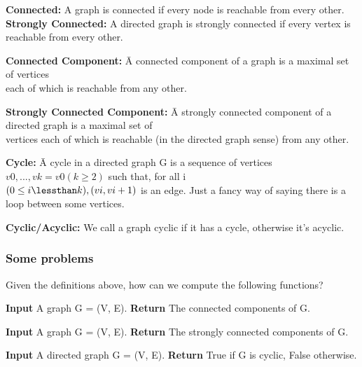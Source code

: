 \documentclass[11pt]{article}
\begin{document}
\noindent\textbf{Connected:} A graph is connected if every node is reachable from every other.\\

\noindent\textbf{Strongly Connected:} A directed graph is strongly connected if every vertex is reachable from every other.

\begin{tabbing}
\textbf{Connected Component:} \=A connected component of a graph is a maximal set of vertices \\ \> each of which is reachable from any other.
\end{tabbing}

\begin{tabbing}
\textbf{Strongly Connected Component:} \=A strongly connected component of a directed graph is a maximal set of\\ \>vertices each of which is reachable (in the directed graph sense) from any other.\\
\end{tabbing}

\begin{tabbing}
\noindent\textbf{Cycle:} \=A cycle in a directed graph G is a sequence of vertices $v0, . . . , vk = v0 (k \geq 2)$ such that, for all i\\ \>$(0 \leq i \lessthan k),(vi, vi+1)$ is an edge. Just a fancy way of saying there is a loop between some vertices.\\
\end{tabbing}

\noindent\textbf{Cyclic/Acyclic:} We call a graph cyclic if it has a cycle, otherwise it's acyclic.

\bigskip
\subsubsection{Some problems}
Given the definitions above, how can we compute the following functions?

\begin{algorithm}
\caption{Connected Components}\label{}
\begin{algorithmic}[1]
\State \textbf{Input} A graph G = (V, E).
\State \textbf{Return} The connected components of G.
\end{algorithmic}
\end{algorithm}
\begin{algorithm}
\caption{Strongly Connected Components}\label{}
\begin{algorithmic}[1]
\State \textbf{Input} A graph G = (V, E).
\State \textbf{Return} The strongly connected components of G.
\end{algorithmic}
\end{algorithm}
\begin{algorithm}
\caption{Cyclicity}\label{}
\begin{algorithmic}[1]
\State \textbf{Input} A directed graph G = (V, E).
\State \textbf{Return} True if G is cyclic, False otherwise.
\end{algorithmic}
\end{algorithm}

\newpage
\end{document}
